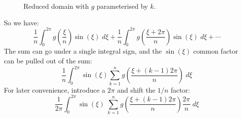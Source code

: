 \documentclass[12pt, a4paper, twoside, openright]{book}
\begin{document}
\clearpage
\begin{figure}[ht]
\centering
{}
\caption{Reduced domain with $g$ parameterised by $k$.}\label{reduced}
\end{figure}

So we have:
\begin{equation}
\frac{1}{n}   \int_0^{2\pi} g\left(\frac{\xi}{n}\right) \sin(\xi) \;d\xi
 + \frac{1}{n}   \int_0^{2\pi} g\left(\frac{\xi + 2\pi}{n} \right) \sin(\xi) \;d\xi
 + \cdots
\end{equation}
The sum can go under a single integral sign, and the $\sin(\xi)$ common factor can be pulled out of the sum:
\begin{equation}
\frac{1}{n} \int_0^{2\pi} \sin(\xi)
 \sum_{k=1}^n g\left(\frac{\xi + (k-1) 2\pi}{n} \right) \;d\xi
\end{equation}
For later convenience, introduce a $2\pi$ and shift the $1/n$ factor:
\begin{equation}
\frac{1}{2\pi} \int_0^{2\pi} \sin(\xi) \;
 \sum_{k=1}^n g\left(\frac{\xi + (k-1) 2\pi}{n} \right) \frac{2\pi}{n} \;d\xi
 \end{equation}
\end{document}
